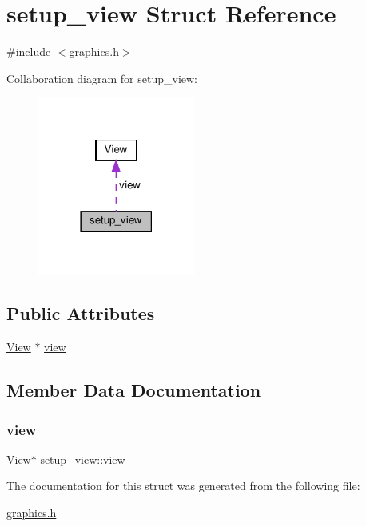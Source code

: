 \hypertarget{structsetup__view}{}\section{setup\+\_\+view Struct Reference}
\label{structsetup__view}


{\ttfamily \#include $<$graphics.\+h$>$}



Collaboration diagram for setup\+\_\+view\+:
\nopagebreak
\begin{figure}[H]
\begin{center}
\leavevmode
\includegraphics[width=146pt]{structsetup__view__coll__graph}
\end{center}
\end{figure}
\subsection*{Public Attributes}
\begin{DoxyCompactItemize}
\item 
\hyperlink{structView}{View} $\ast$ \hyperlink{structsetup__view_a480e2ffffe2e3294b565910c2fa55ee7}{view}
\end{DoxyCompactItemize}


\subsection{Member Data Documentation}
\mbox{\label{structsetup__view_a480e2ffffe2e3294b565910c2fa55ee7}} 
\subsubsection{\texorpdfstring{view}{view}}
{\footnotesize\ttfamily \hyperlink{structView}{View}$\ast$ setup\+\_\+view\+::view}



The documentation for this struct was generated from the following file\+:\begin{DoxyCompactItemize}
\item 
\hyperlink{graphics_8h}{graphics.\+h}\end{DoxyCompactItemize}
